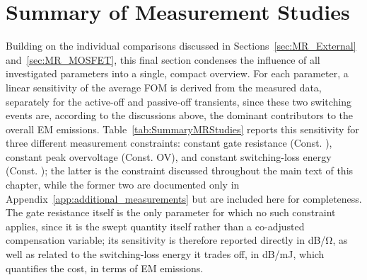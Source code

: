 \section{Summary of Measurement Studies}
\label{sec:MR_Summary}

Building on the individual comparisons discussed in Sections~\ref{sec:MR_External} and~\ref{sec:MR_MOSFET}, this final section condenses the influence of all investigated parameters into a single, compact overview.
For each parameter, a linear sensitivity of the average FOM is derived from the measured data, separately for the active-off and passive-off transients, since these two switching events are, according to the discussions above, the dominant contributors to the overall EM emissions.
Table~\ref{tab:SummaryMRStudies} reports this sensitivity for three different measurement constraints: constant gate resistance (Const. ), constant peak overvoltage (Const. OV), and constant switching-loss energy (Const. ); the latter is the constraint discussed throughout the main text of this chapter, while the former two are documented only in Appendix~\ref{app:additional_measurements} but are included here for completeness.
The gate resistance itself is the only parameter for which no such constraint applies, since it is the swept quantity itself rather than a co-adjusted compensation variable; its sensitivity is therefore reported directly in \si{dB/\ohm}, as well as related to the switching-loss energy it trades off, in \si{dB/mJ}, which quantifies the cost, in terms of EM emissions.

